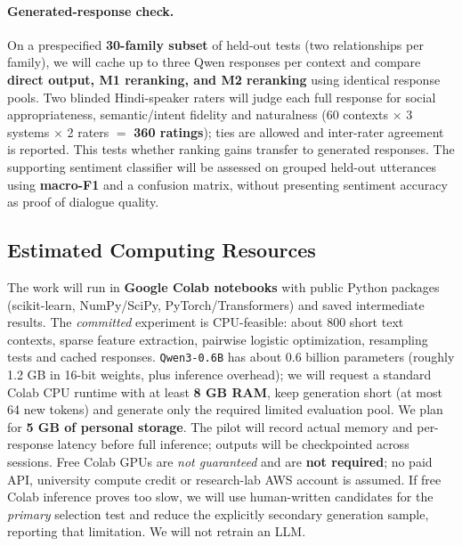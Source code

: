 \documentclass[11pt]{article}
\begin{document}
\paragraph{Generated-response check.}
On a prespecified \textbf{30-family subset} of held-out tests (two relationships per family), we will cache up to three Qwen responses per context and compare \textbf{direct output, M1 reranking, and M2 reranking} using identical response pools. Two blinded Hindi-speaker raters will judge each full response for social appropriateness, semantic/intent fidelity and naturalness (60 contexts $\times$ 3 systems $\times$ 2 raters $=$ \textbf{360 ratings}); ties are allowed and inter-rater agreement is reported. This tests whether ranking gains transfer to generated responses. The supporting sentiment classifier will be assessed on grouped held-out utterances using \textbf{macro-F1} and a confusion matrix, without presenting sentiment accuracy as proof of dialogue quality.

\subsection{Estimated Computing Resources}
The work will run in \textbf{Google Colab notebooks} with public Python packages (scikit-learn, NumPy/SciPy, PyTorch/Transformers) and saved intermediate results. The \emph{committed} experiment is CPU-feasible: about 800 short text contexts, sparse feature extraction, pairwise logistic optimization, resampling tests and cached responses. \texttt{Qwen3-0.6B} has about 0.6 billion parameters (roughly 1.2 GB in 16-bit weights, plus inference overhead); we will request a standard Colab CPU runtime with at least \textbf{8 GB RAM}, keep generation short (at most 64 new tokens) and generate only the required limited evaluation pool. We plan for \textbf{5 GB of personal storage}. The pilot will record actual memory and per-response latency before full inference; outputs will be checkpointed across sessions. Free Colab GPUs are \emph{not guaranteed} and are \textbf{not required}; no paid API, university compute credit or research-lab AWS account is assumed. If free Colab inference proves too slow, we will use human-written candidates for the \emph{primary} selection test and reduce the explicitly secondary generation sample, reporting that limitation. We will not retrain an LLM.

\clearpage


\end{document}
